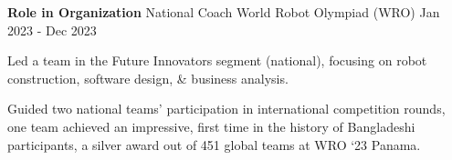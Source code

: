 

\begin{cventries}

  \vspace{-0.3mm}
  \cventryalt
    {\textbf{Role in Organization}} %
    {National Coach} %
    {World Robot Olympiad (WRO)} %
    {Jan 2023 - Dec 2023} %
    {
      \begin{cvitems} %
        \item {Led a team in the Future Innovators segment (national), focusing on robot construction, software design, \& business analysis.}
        \item {Guided two national teams' participation in international competition rounds, one team achieved an impressive, first time in the history of Bangladeshi participants, a silver award out of 451 global teams at WRO ‘23 Panama.}
      \end{cvitems}
    }


\end{cventries}
